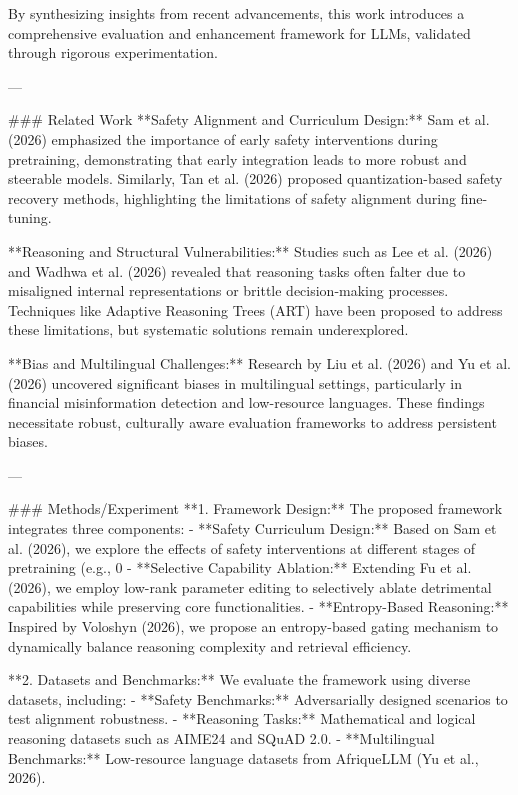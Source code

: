 By synthesizing insights from recent advancements, this work introduces a comprehensive evaluation and enhancement framework for LLMs, validated through rigorous experimentation.

---

### Related Work  
**Safety Alignment and Curriculum Design:**  
Sam et al. (2026) emphasized the importance of early safety interventions during pretraining, demonstrating that early integration leads to more robust and steerable models. Similarly, Tan et al. (2026) proposed quantization-based safety recovery methods, highlighting the limitations of safety alignment during fine-tuning.

**Reasoning and Structural Vulnerabilities:**  
Studies such as Lee et al. (2026) and Wadhwa et al. (2026) revealed that reasoning tasks often falter due to misaligned internal representations or brittle decision-making processes. Techniques like Adaptive Reasoning Trees (ART) have been proposed to address these limitations, but systematic solutions remain underexplored.

**Bias and Multilingual Challenges:**  
Research by Liu et al. (2026) and Yu et al. (2026) uncovered significant biases in multilingual settings, particularly in financial misinformation detection and low-resource languages. These findings necessitate robust, culturally aware evaluation frameworks to address persistent biases.

---

### Methods/Experiment  
**1. Framework Design:**  
The proposed framework integrates three components:  
- **Safety Curriculum Design:** Based on Sam et al. (2026), we explore the effects of safety interventions at different stages of pretraining (e.g., 0%
- **Selective Capability Ablation:** Extending Fu et al. (2026), we employ low-rank parameter editing to selectively ablate detrimental capabilities while preserving core functionalities.  
- **Entropy-Based Reasoning:** Inspired by Voloshyn (2026), we propose an entropy-based gating mechanism to dynamically balance reasoning complexity and retrieval efficiency.

**2. Datasets and Benchmarks:**  
We evaluate the framework using diverse datasets, including:  
- **Safety Benchmarks:** Adversarially designed scenarios to test alignment robustness.  
- **Reasoning Tasks:** Mathematical and logical reasoning datasets such as AIME24 and SQuAD 2.0.  
- **Multilingual Benchmarks:** Low-resource language datasets from AfriqueLLM (Yu et al., 2026).

